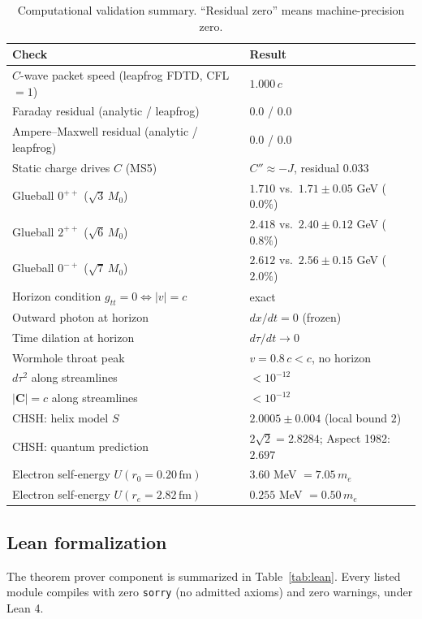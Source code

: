 \documentclass[aps,prd,preprint,superscriptaddress,amsmath,amssymb]{revtex4-2}
\begin{document}
\begin{table}[h]
\caption{Computational validation summary.  ``Residual zero'' means
machine-precision zero.}
\label{tab:validation}
\begin{ruledtabular}
\begin{tabular}{ll}
Check & Result \\
\hline
$C$-wave packet speed (leapfrog FDTD, CFL$=1$) & $1.000\,c$ \\
Faraday residual (analytic / leapfrog) & $0.0$ / $0.0$ \\
Ampere--Maxwell residual (analytic / leapfrog) & $0.0$ / $0.0$ \\
Static charge drives $C$ (MS5) & $C''\approx -J$, residual $0.033$ \\
Glueball $0^{++}$ ($\sqrt3\,M_0$) & $1.710$ vs.\ $1.71\pm0.05$ GeV ($0.0\%$) \\
Glueball $2^{++}$ ($\sqrt6\,M_0$) & $2.418$ vs.\ $2.40\pm0.12$ GeV ($0.8\%$) \\
Glueball $0^{-+}$ ($\sqrt7\,M_0$) & $2.612$ vs.\ $2.56\pm0.15$ GeV ($2.0\%$) \\
Horizon condition $g_{tt}=0\Leftrightarrow|v|=c$ & exact \\
Outward photon at horizon & $dx/dt=0$ (frozen) \\
Time dilation at horizon & $d\tau/dt\to 0$ \\
Wormhole throat peak & $v=0.8\,c<c$, no horizon \\
$d\tau^2$ along streamlines & $<10^{-12}$ \\
$|\bm{C}|=c$ along streamlines & $<10^{-12}$ \\
CHSH: helix model $S$ & $2.0005\pm0.004$ (local bound $2$) \\
CHSH: quantum prediction & $2\sqrt2=2.8284$; Aspect 1982: $2.697$ \\
Electron self-energy $U(r_0=0.20\,\mathrm{fm})$ & $3.60$ MeV $=7.05\,m_e$ \\
Electron self-energy $U(r_e=2.82\,\mathrm{fm})$ & $0.255$ MeV $=0.50\,m_e$ \\
\end{tabular}
\end{ruledtabular}
\end{table}

\subsection{Lean formalization}

The theorem prover component is summarized in Table~\ref{tab:lean}.  Every
listed module compiles with zero \texttt{sorry} (no admitted axioms) and
zero warnings, under Lean 4.
\end{document}
